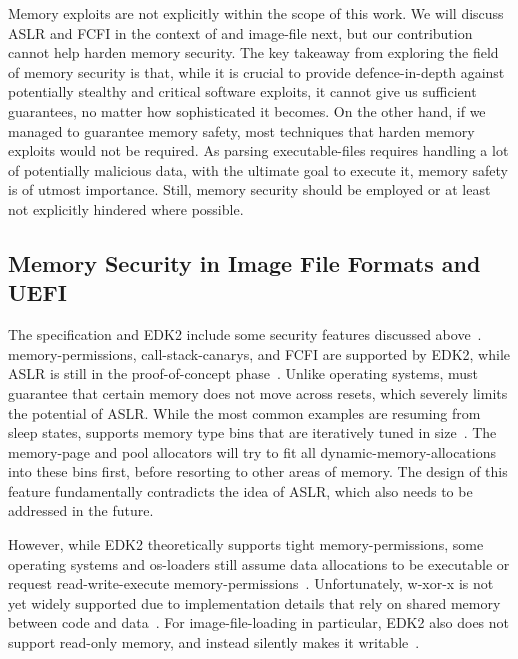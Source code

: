 Memory exploits are not explicitly within the scope of this work. We will discuss \gls{ASLR} and \gls{FCFI} in the context of  and \gls{image-file} next, but our contribution cannot help harden memory security. The key takeaway from exploring the field of memory security is that, while it is crucial to provide defence-in-depth against potentially stealthy and critical software exploits, it cannot give us sufficient guarantees, no matter how sophisticated it becomes. On the other hand, if we managed to guarantee memory safety, most techniques that harden memory exploits would not be required. As parsing \glspl{executable-file} requires handling a lot of potentially malicious data, with the ultimate goal to execute it, memory safety is of utmost importance. Still, memory security should be employed or at least not explicitly hindered where possible.

\subsection{Memory Security in Image File Formats and UEFI}

The  specification and \gls{EDK2} include some security features discussed above~\cite{uefi-spec,edk2,edk2-memory-safety}. \Gls{memory-permissions}, \glspl{call-stack-canary}, and \gls{FCFI} are supported by \gls{EDK2}, while \gls{ASLR} is still in the proof-of-concept phase~\cite{edk2-memory-safety}. Unlike operating systems,  must guarantee that certain memory does not move across resets, which severely limits the potential of \gls{ASLR}. While the most common examples are resuming from sleep states,  supports memory type bins that are iteratively tuned in size~\cite{edk2}. The \gls{memory-page} and pool allocators will try to fit all \glspl{dynamic-memory-allocation} into these bins first, before resorting to other areas of memory. The design of this feature fundamentally contradicts the idea of \gls{ASLR}, which also needs to be addressed in the future.

However, while \gls{EDK2} theoretically supports tight \gls{memory-permissions}, some operating systems and \glspl{os-loader} still assume data allocations to be executable or request read-write-execute \gls{memory-permissions}~\cite{grub-nx-bug,linux-wxorx}. Unfortunately, \gls{w-xor-x} is not yet widely supported due to implementation details that rely on shared memory between code and data~\cite{edk2-wxorx}. For \gls{image-file-loading} in particular, \gls{EDK2} also does not support read-only memory, and instead silently makes it writable~\cite{edk2-granular-pe}.

